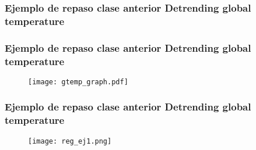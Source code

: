 \documentclass[spanish,xcolor=table]{beamer}
\begin{document}
\begin{frame}
\frametitle{Ejemplo de repaso clase anterior\newline
Detrending global temperature}


\end{frame}
\begin{frame}
\frametitle{Ejemplo de repaso clase anterior\newline
Detrending global temperature}

\begin{figure}[t!]
\texttt{[image: gtemp\_graph.pdf]}
\end{figure}
 
\end{frame}

\begin{frame}
\frametitle{Ejemplo de repaso clase anterior\newline
Detrending global temperature}

\begin{figure}[t!]
\texttt{[image: reg\_ej1.png]}
\end{figure}
 
\end{frame}
\end{document}
